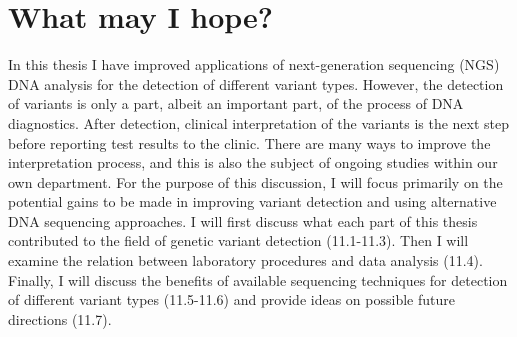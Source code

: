 \chapter{What may I hope? }
\label{chap:discussion}

{ \Large {} }


\newpage


In this thesis I have improved applications of next-generation sequencing (NGS) DNA analysis for the detection of different variant types. 
However, the detection of variants is only a part, albeit an important part, of the process of DNA diagnostics. 
After detection, clinical interpretation of the variants is the next step before reporting test results to the clinic. 
There are many ways to improve the interpretation process, and this is also the subject of ongoing studies within our own department. 
For the purpose of this discussion, I will focus primarily on the potential gains to be made in improving variant detection and using alternative DNA sequencing approaches. 
I will first discuss what each part of this thesis contributed to the field of genetic variant detection (11.1-11.3).
Then I will examine the relation between laboratory procedures and data analysis (11.4). 
Finally, I will discuss the benefits of available sequencing techniques for detection of different variant types (11.5-11.6) and provide ideas on possible future directions (11.7).

